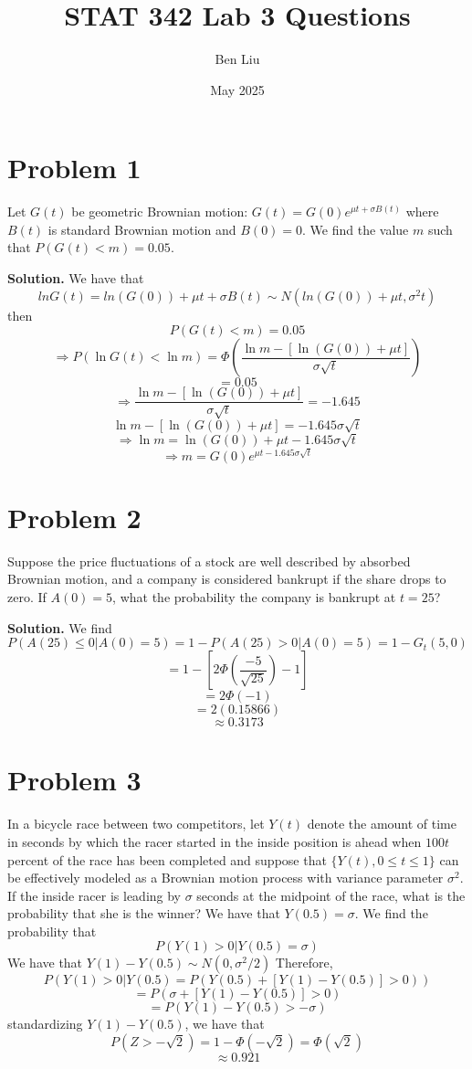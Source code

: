 \documentclass{article}
\title{STAT 342 Lab 3 Questions}
\author{Ben Liu}
\date{May 2025}
\newcommand{\bi}{\bigbreak \noindent}
\newcommand{\proof}{\bi \textbf{Solution. }}
\begin{document}
\maketitle

\section{Problem 1}
Let $G(t)$ be geometric Brownian motion: $G(t)=G(0)e^{\mu t + \sigma B(t)}$ where $B(t)$ 
is standard Brownian motion and $B(0)=0$. We find the value $m$ such that 
$P(G(t)< m)=0.05$. 

\proof 
We have that 
$$lnG(t)=ln(G(0))+\mu t + \sigma B(t)\sim N(ln(G(0))+\mu t, \sigma^2 t)$$
then 
$$P(G(t)< m)= 0.05$$
$$\Rightarrow P(\ln G(t) < \ln m) = \Phi(\frac{\ln m - [\ln(G(0))+\mu t]}{\sigma \sqrt{t}})$$
$$=0.05$$
$$\Rightarrow \frac{\ln m - [\ln(G(0))+\mu t]}{\sigma \sqrt{t}}=-1.645$$
$$\ln m -[\ln(G(0)) + \mu t]=-1.645\sigma \sqrt{t}$$
$$\Rightarrow \ln m = \ln(G(0))+\mu t -1.645\sigma \sqrt{t}$$
$$\Rightarrow m = G(0)e^{\mu t -1.645\sigma \sqrt{t}}$$

\section{Problem 2}
Suppose the price fluctuations of a stock are well described by absorbed Brownian motion, 
and a company is considered bankrupt if the share drops to zero. If $A(0)=5$, what 
the probability the company is bankrupt at $t=25$? 

\proof We find 
$$P(A(25)\leq 0 | A(0)=5)=1-P(A(25)>0 | A(0)=5)=1-G_t(5,0)$$
$$=1-[2\Phi(\frac{-5}{\sqrt{25}})-1]$$
$$=2\Phi(-1)$$
$$=2(0.15866)$$
$$\approx 0.3173$$
\section{Problem 3} 
In a bicycle race between two competitors, let 
$Y(t)$ denote the amount of time in seconds 
by which the racer started in the inside position 
is ahead when $100t$ percent of the race has been completed
and suppose that $\{Y(t), 0\leq t\leq 1\}$ can be effectively
modeled as a Brownian motion process with variance
parameter $\sigma^2$. 
\bi
If the inside racer is leading by 
$\sigma$ seconds at the midpoint of the 
race, what is the probability that she is the winner?
\bi
We have that $Y(0.5)=\sigma$. We find the probability that 
$$P(Y(1)>0 | Y(0.5)=\sigma)$$
We have that $Y(1)-Y(0.5)\sim N(0,\sigma^2/2)$ 
Therefore, 
$$P(Y(1)>0 | Y(0.5)=P(Y(0.5)+[Y(1)-Y(0.5)]>0))$$
$$=P(\sigma + [Y(1)-Y(0.5)] > 0)$$
$$=P(Y(1)-Y(0.5)>-\sigma)$$
standardizing $Y(1)-Y(0.5)$, we have that 
$$P(Z > -\sqrt{2})=1-\Phi(-\sqrt{2})=\Phi(\sqrt{2})$$
$$\approx 0.921$$
\end{document}
